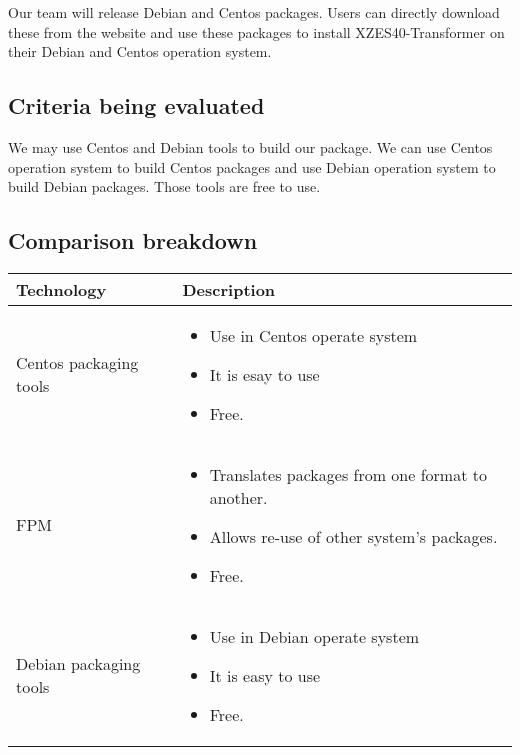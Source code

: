 Our team will release Debian and Centos packages.
Users can directly download these from the website and use these packages to install XZES40-Transformer on their Debian and Centos operation system.

\subsection{Criteria being evaluated}

We may use Centos and Debian tools to build our package.
We can use Centos operation system to build Centos packages and use Debian operation system to build Debian packages.
Those tools are free to use.

\subsection{Comparison breakdown}

\begin{center}
  \begin{tabular}{ | l | p{10cm} |}
    \hline
    Technology & Description  \\ \hline
    Centos packaging tools \cite{centos-tool} &
    \begin{itemize}
      \item Use in Centos operate system 
      \item It is esay to use
      \item Free.
    \end{itemize}\\ \hline
    FPM \cite{fpm-home} &
    \begin{itemize}
      \item Translates packages from one format to another.
      \item Allows re-use of other system's packages.
      \item Free.
    \end{itemize}\\ \hline
    Debian packaging tools \cite{debian-tool} &
    \begin{itemize}
      \item Use in Debian operate system
      \item It is easy to use
      \item Free.
    \end{itemize}\\ \hline
  \end{tabular}
\end{center}

